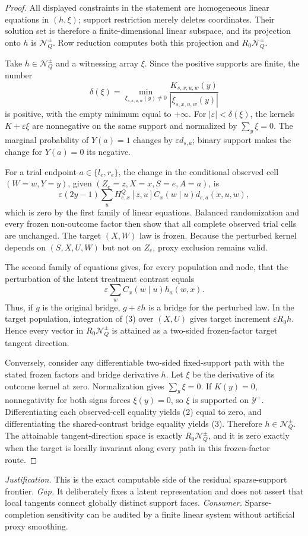 \documentclass{article}
\begin{document}
\begin{proof}
All displayed constraints in the statement are homogeneous linear equations in \((h,\xi)\); support restriction merely deletes coordinates.  Their solution set is therefore a finite-dimensional linear subspace, and its projection onto \(h\) is \(\mathcal N_Q^{\pm}\).  Row reduction computes both this projection and \(R_0\mathcal N_Q^{\pm}\).

Take \(h\in\mathcal N_Q^{\pm}\) and a witnessing array \(\xi\).  Since the positive supports are finite, the number
\[
\delta(\xi)=
\min_{\xi_{s,x,u,w}(y)\ne0}
\frac{K_{s,x,u,w}(y)}{|\xi_{s,x,u,w}(y)|}
\tag{1}
\]
is positive, with the empty minimum equal to \(+\infty\).  For \(|\varepsilon|<\delta(\xi)\), the kernels \(K+\varepsilon\xi\) are nonnegative on the same support and normalized by \(\sum_y\xi=0\).  The marginal probability of \(Y(a)=1\) changes by \(\varepsilon d_{s,a}\); binary support makes the change for \(Y(a)=0\) its negative.

For a trial endpoint \(a\in\{l_e,r_e\}\), the change in the conditional observed cell \((W=w,Y=y)\), given \((Z_e=z,X=x,S=e,A=a)\), is
\[
\varepsilon(2y-1)
\sum_uH^Q_{e,x}[z,u]C_x(w\mid u)d_{e,a}(x,u,w),
\tag{2}
\]
which is zero by the first family of linear equations.  Balanced randomization and every frozen non-outcome factor then show that all complete observed trial cells are unchanged.  The target \((X,W)\) law is frozen.  Because the perturbed kernel depends on \((S,X,U,W)\) but not on \(Z_e\), proxy exclusion remains valid.

The second family of equations gives, for every population and node, that the perturbation of the latent treatment contrast equals
\[
\varepsilon\sum_wC_x(w\mid u)h_a(w,x).
\tag{3}
\]
Thus, if \(g\) is the original bridge, \(g+\varepsilon h\) is a bridge for the perturbed law.  In the target population, integration of (3) over \((X,U)\) gives target increment \(\varepsilon R_0h\).  Hence every vector in \(R_0\mathcal N_Q^{\pm}\) is attained as a two-sided frozen-factor target tangent direction.

Conversely, consider any differentiable two-sided fixed-support path with the stated frozen factors and bridge derivative \(h\).  Let \(\xi\) be the derivative of its outcome kernel at zero.  Normalization gives \(\sum_y\xi=0\).  If \(K(y)=0\), nonnegativity for both signs forces \(\xi(y)=0\), so \(\xi\) is supported on \(\mathcal Y^+\).  Differentiating each observed-cell equality yields (2) equal to zero, and differentiating the shared-contrast bridge equality yields (3).  Therefore \(h\in\mathcal N_Q^{\pm}\).  The attainable tangent-direction space is exactly \(R_0\mathcal N_Q^{\pm}\), and it is zero exactly when the target is locally invariant along every path in this frozen-factor route.
\end{proof}
\par\smallskip\noindent \textit{Justification.} This is the exact computable side of the residual sparse-support frontier. \textit{Gap.} It deliberately fixes a latent representation and does not assert that local tangents connect globally distinct support faces. \textit{Consumer.} Sparse-completion sensitivity can be audited by a finite linear system without artificial proxy smoothing.
\end{document}

